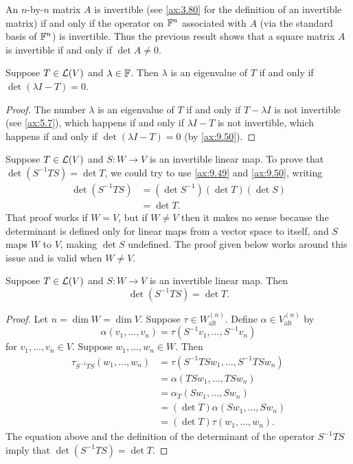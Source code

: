 An $n$-by-$n$ matrix $A$ is invertible (see \ref{ax:3.80} for the definition of
an invertible matrix) if and only if the operator on $\mathbb{F}^n$ associated with
$A$ (via the standard basis of $\mathbb{F}^n$) is invertible. Thus the previous result
shows that a square matrix $A$ is invertible if and only if $\det A\ne0$.

\begin{result}\label{ax:9.51}
Suppose $T\in\mathcal{L}(V)$ and $\lambda\in\mathbb{F}$. Then $\lambda$ is an eigenvalue of
$T$ if and only if $\det(\lambda I-T)=0$.
\end{result}

\begin{proof}
The number $\lambda$ is an eigenvalue of $T$ if and only if $T-\lambda I$ is
not invertible (see \ref{ax:5.7}), which happens if and only if $\lambda I-T$
is not invertible, which happens if and only if $\det(\lambda I-T)=0$ (by
\ref{ax:9.50}).
\end{proof}

Suppose $T\in\mathcal{L}(V)$ and $S\colon W\to V$ is an invertible linear map. To
prove that $\det(S^{-1}TS)=\det T$, we could try to use \ref{ax:9.49} and
\ref{ax:9.50}, writing
\begin{align*}
\det(S^{-1}TS) &= (\det S^{-1})(\det T)(\det S)\\
               &= \det T.
\end{align*}
That proof works if $W=V$, but if $W\ne V$ then it makes no sense because the
determinant is defined only for linear maps from a vector space to itself, and
$S$ maps $W$ to $V$, making $\det S$ undefined. The proof given below works
around this issue and is valid when $W\ne V$.

\begin{result}\label{ax:9.52}
Suppose $T\in\mathcal{L}(V)$ and $S\colon W\to V$ is an invertible linear map. Then
\[ \det(S^{-1}TS) = \det T. \]
\end{result}

\begin{proof}
Let $n=\dim W=\dim V$. Suppose $\tau\in W_{\mathrm{alt}}^{(n)}$. Define
$\alpha\in V_{\mathrm{alt}}^{(n)}$ by
\[ \alpha(v_1,\dots,v_n) = \tau(S^{-1}v_1,\dots,S^{-1}v_n) \]
for $v_1,\dots,v_n\in V$. Suppose $w_1,\dots,w_n\in W$. Then
\begin{align*}
\tau_{S^{-1}TS}(w_1,\dots,w_n) &= \tau(S^{-1}TSw_1,\dots,S^{-1}TSw_n)\\
  &= \alpha(TSw_1,\dots,TSw_n)\\
  &= \alpha_T(Sw_1,\dots,Sw_n)\\
  &= (\det T)\alpha(Sw_1,\dots,Sw_n)\\
  &= (\det T)\tau(w_1,\dots,w_n).
\end{align*}
The equation above and the definition of the determinant of the operator
$S^{-1}TS$ imply that $\det(S^{-1}TS)=\det T$.
\end{proof}

